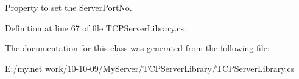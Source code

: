 Property to set the ServerPortNo. 

Definition at line 67 of file TCPServerLibrary.cs.

The documentation for this class was generated from the following file:\begin{DoxyCompactItemize}
\item 
E:/my.net work/10-\/10-\/09/MyServer/TCPServerLibrary/TCPServerLibrary.cs\end{DoxyCompactItemize}
